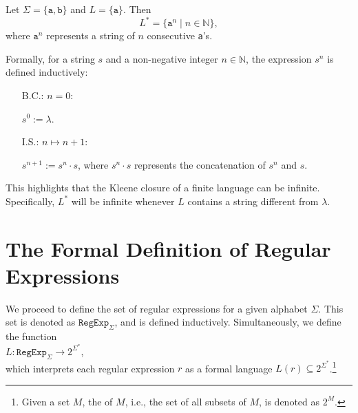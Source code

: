 \exampleEng
Let \( \Sigma = \{ \texttt{a}, \texttt{b} \} \) and \( L = \{ \texttt{a} \} \). Then
\[
L^* = \{ \texttt{a}^n \mid n \in \mathbb{N} \},
\]
where \( \texttt{a}^n \) represents a string of \( n \) consecutive \texttt{a}'s. \eox

Formally, for a string \( s \) and a non-negative integer \( n \in \mathbb{N} \), the expression \( s^n \) is defined inductively:
\begin{enumerate}
\item[B.C.:] \( n = 0 \):

             \( s^0 := \lambda \).
\item[I.S.:] \( n \mapsto n + 1 \):

             \( s^{n+1} := s^n \cdot s \),  \quad where \( s^n \cdot s \) represents the concatenation of \( s^n \) and \( s \).
\eox
\end{enumerate}

This highlights that the Kleene closure of a finite language can be infinite. Specifically, \( L^* \) will be
infinite whenever \( L \) contains a string different from \( \lambda \). 


\section{The Formal Definition of Regular Expressions}
We proceed to define the set of regular expressions for a given alphabet \( \Sigma \). This set is denoted as
\( \texttt{RegExp}_\Sigma \), and is defined inductively. Simultaneously, we define the function 
\\[0.2cm]
\hspace*{1.3cm}
$L: \texttt{RegExp}_\Sigma \rightarrow 2^{\Sigma^*}$,
\\[0.2cm]
which interprets each regular expression \( r \) as a formal language \( L(r) \subseteq 2^{\Sigma^*} \).\footnote{
  Given a set \( M \), the  of \( M \), i.e., the set of all subsets of \( M \), is denoted as \( 2^M \).
}
\pagebreak


